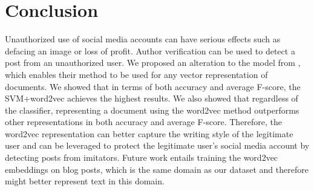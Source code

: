 \documentclass[11pt]{article}
\begin{document}


\section{Conclusion}\label{sec:conclusion}

Unauthorized use of social media accounts can have serious effects
such as defacing an image or loss of profit. Author verification can
be used to detect a post from an unauthorized user. We proposed an
alteration to the model from \cite{jankowska2014}, which enables their
method to be used for any vector representation of documents. We
showed that in terms of both accuracy and average F-score, the
SVM+word2vec achieves the highest results. We also showed that
regardless of the classifier, representing a document using the
word2vec method outperforms other representations in both accuracy and
average F-score. Therefore, the word2vec representation can better
capture the writing style of the legitimate user and can be leveraged
to protect the legitimate user's social media account by detecting
posts from imitators. Future work entails training the word2vec embeddings
on blog posts, which is the same domain as our dataset and therefore
might better represent text in this domain. 

\end{document}
